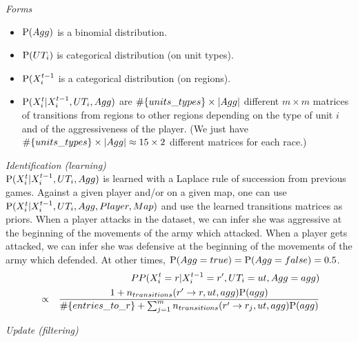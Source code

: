 \vspace{0.3cm}
\textit{Forms}\\

\begin{itemize}
    \item $\mathrm{P}(Agg)$ is a binomial distribution.
    \item $\mathrm{P}(UT_i)$ is categorical distribution (on unit types).
    \item $\mathrm{P}(X^{t-1}_{i}$ is a categorical distribution (on regions).
    \item $\mathrm{P}(X^t_i|X^{t-1}_i,UT_i,Agg)$ are $\#\{units\_types\} \times \left\lvert Agg\right\rvert$ different $m\times m$ matrices of transitions from regions to other regions depending on the type of unit $i$ and of the aggressiveness of the player. (We just have $\#\{units\_types\} \times \left\lvert Agg\right\rvert \approx 15\times 2$ different matrices for each race.)
\end{itemize}


\vspace{0.3cm}
\textit{Identification (learning)}\\

$\mathrm{P}(X^t_i|X^{t-1}_i, UT_i, Agg)$ is learned with a Laplace rule of succession from previous games. Against a given player and/or on a given map, one can use $\mathrm{P}(X^t_i|X^{t-1}_i, UT_i, Agg, Player, Map)$ and use the learned transitions matrices as priors. When a player attacks in the dataset, we can infer she was aggressive at the beginning of the movements of the army which attacked. When a player gets attacked, we can infer she was defensive at the beginning of the movements of the army which defended. At other times, $\mathrm{P}(Agg=true) = \mathrm{P}(Agg=false) = 0.5$.
\begin{eqnarray*}
& & PP(X^t_i=r|X^{t-1}_i=r', UT_i=ut, Agg=agg) \\
& \propto & \frac{1+n_{transitions}(r'\rightarrow r, ut, agg)\mathrm{P}(agg)}{\#\{entries\_to\_r\} + \sum_{j=1}^{m} n_{transitions}(r' \rightarrow r_j, ut, agg)\mathrm{P}(agg)}
\end{eqnarray*}

\vspace{0.3cm}
\textit{Update (filtering)}\\

